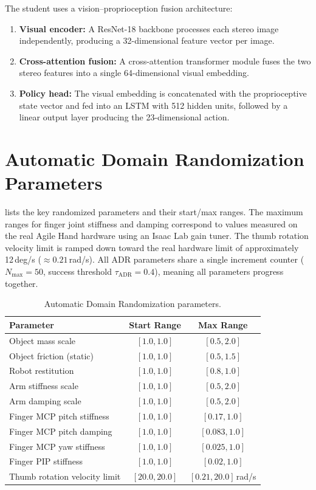 The student uses a vision--proprioception fusion architecture:
\begin{enumerate}
    \item \textbf{Visual encoder:} A ResNet-18 backbone processes each stereo image independently, producing a 32-dimensional feature vector per image.
    \item \textbf{Cross-attention fusion:} A cross-attention transformer module fuses the two stereo features into a single 64-dimensional visual embedding.
    \item \textbf{Policy head:} The visual embedding is concatenated with the proprioceptive state vector and fed into an \ac{LSTM} with 512 hidden units, followed by a linear output layer producing the 23-dimensional action.
\end{enumerate}

\section{Automatic Domain Randomization Parameters}%
\label{app:adr_params}%

 lists the key randomized parameters and their start/max ranges.
The maximum ranges for finger joint stiffness and damping correspond to values measured on the real Agile Hand hardware using an Isaac Lab gain tuner.
The thumb rotation velocity limit is ramped down toward the real hardware limit of approximately 12\,deg/s ($\approx 0.21$\,rad/s).
All \ac{ADR} parameters share a single increment counter ($N_{\text{max}} = 50$, success threshold $\tau_{\text{ADR}} = 0.4$), meaning all parameters progress together.

\begin{table}[htb]
    \centering
    \caption{Automatic Domain Randomization parameters.}
    \label{tab:adr_params}
    \begin{tabular}{lcc}
        \toprule
        \textbf{Parameter} & \textbf{Start Range} & \textbf{Max Range} \\
        \midrule
        Object mass scale & $[1.0, 1.0]$ & $[0.5, 2.0]$ \\
        Object friction (static) & $[1.0, 1.0]$ & $[0.5, 1.5]$ \\
        Robot restitution & $[1.0, 1.0]$ & $[0.8, 1.0]$ \\
        Arm stiffness scale & $[1.0, 1.0]$ & $[0.5, 2.0]$ \\
        Arm damping scale & $[1.0, 1.0]$ & $[0.5, 2.0]$ \\
        Finger MCP pitch stiffness & $[1.0, 1.0]$ & $[0.17, 1.0]$ \\
        Finger MCP pitch damping & $[1.0, 1.0]$ & $[0.083, 1.0]$ \\
        Finger MCP yaw stiffness & $[1.0, 1.0]$ & $[0.025, 1.0]$ \\
        Finger PIP stiffness & $[1.0, 1.0]$ & $[0.02, 1.0]$ \\
        Thumb rotation velocity limit & $[20.0, 20.0]$ & $[0.21, 20.0]$\,rad/s \\
        \bottomrule
    \end{tabular}
\end{table}

